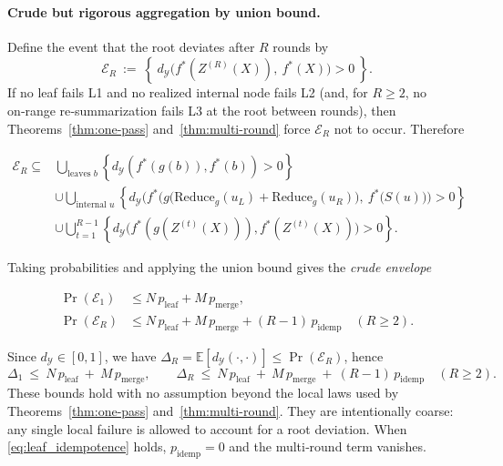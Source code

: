 \documentclass[11pt]{article}
\newcommand{\Y}{\mathcal{Y}}               %
\newcommand{\fstar}{f^*}               %
\newcommand{\E}{\mathbb{E}}
\newcommand{\metric}{d_{\Y}}
\newcommand{\reduce}{\text{Reduce}}
\newcommand{\reduceg}{\reduce_g}
\begin{document}
\paragraph{Crude but rigorous aggregation by union bound.}
Define the event that the root deviates after $R$ rounds by
\[
\mathcal{E}_R\ :=\ \left\{\ \metric\!\big(\fstar(Z^{(R)}(X)),\ \fstar(X)\big)>0\ \right\}.
\]
If no leaf fails L1 and no realized internal node fails L2 (and, for $R\ge2$, no on‑range
re‑summarization fails L3 at the root between rounds), then Theorems~\ref{thm:one-pass}
and~\ref{thm:multi-round} force $\mathcal{E}_R$ not to occur. Therefore


\begin{align*}
\mathcal{E}_R \subseteq{}& \bigcup_{\text{leaves }b}\left\{\metric(\fstar(g(b)),\fstar(b))>0\right\} \\
&\cup \bigcup_{\text{internal }u}\left\{\metric\!\Big(\fstar\!\big(g(\reduceg(u_L)\!+\!\reduceg(u_R)\big),\ \fstar\!\big(S(u)\big)\Big)>0\right\} \\
&\cup \bigcup_{t=1}^{R-1}\left\{\metric\!\big(\fstar(g(Z^{(t)}(X))),\fstar(Z^{(t)}(X))\big)>0\right\}.
\end{align*}


Taking probabilities and applying the union bound gives the \emph{crude envelope}

\begin{align*}
\Pr(\mathcal{E}_1) &\le N\,p_{\mathrm{leaf}} + M\,p_{\mathrm{merge}}, \\
\Pr(\mathcal{E}_R) &\le N\,p_{\mathrm{leaf}} + M\,p_{\mathrm{merge}} + (R-1)\,p_{\mathrm{idemp}}\quad(R\ge2).
\end{align*}

Since $\metric\in[0,1]$, we have $\Delta_R=\E[\metric(\cdot,\cdot)]\le \Pr(\mathcal{E}_R)$, hence
\begin{equation}\label{eq:unionbound}
\Delta_1\ \le\ N\,p_{\mathrm{leaf}}\ +\ M\,p_{\mathrm{merge}},\qquad
\Delta_R\ \le\ N\,p_{\mathrm{leaf}}\ +\ M\,p_{\mathrm{merge}}\ +\ (R-1)\,p_{\mathrm{idemp}}\quad(R\ge2).
\end{equation}
These bounds hold with no assumption beyond the local laws used by Theorems~\ref{thm:one-pass}
and~\ref{thm:multi-round}. They are intentionally coarse: any single local failure is allowed to
account for a root deviation. When \eqref{eq:leaf_idempotence} holds, $p_{\mathrm{idemp}}=0$ and the
multi‑round term vanishes.
\end{document}
